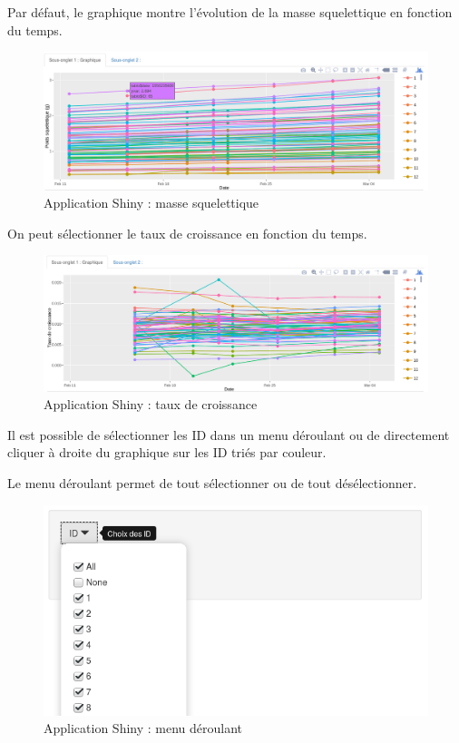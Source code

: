 \documentclass[]{report}
\begin{document}
Par défaut, le graphique montre l'évolution de la masse squelettique en
fonction du temps.

\begin{figure}[h!]
\includegraphics[]{../image/shiny2.PNG}
\caption{Application Shiny : masse squelettique}
\end{figure}

On peut sélectionner le taux de croissance en fonction du temps.

\begin{figure}[h!]
\includegraphics[]{../image/shiny3.PNG}
\caption{Application Shiny : taux de croissance}
\end{figure}

Il est possible de sélectionner les ID dans un menu déroulant ou de
directement cliquer à droite du graphique sur les ID triés par couleur.

Le menu déroulant permet de tout sélectionner ou de tout désélectionner.

\begin{figure}[h!]
\includegraphics[]{../image/shiny4.PNG}
\caption{Application Shiny : menu déroulant}
\end{figure}
\end{document}
